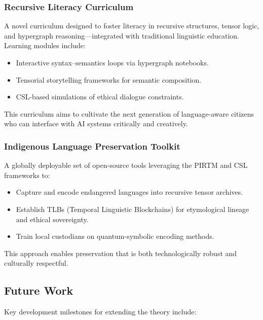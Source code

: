 \documentclass{article}
\theoremstyle{plain}
\theoremstyle{claimstyle}
\begin{document}
\subsubsection*{Recursive Literacy Curriculum}

A novel curriculum designed to foster literacy in recursive structures, tensor logic, and hypergraph reasoning—integrated with traditional linguistic education. Learning modules include:

\begin{itemize}
    \item Interactive syntax–semantics loops via hypergraph notebooks.
    \item Tensorial storytelling frameworks for semantic composition.
    \item CSL-based simulations of ethical dialogue constraints.
\end{itemize}

This curriculum aims to cultivate the next generation of language-aware citizens who can interface with AI systems critically and creatively.

\subsubsection*{Indigenous Language Preservation Toolkit}

A globally deployable set of open-source tools leveraging the PIRTM and CSL frameworks to:

\begin{itemize}
    \item Capture and encode endangered languages into recursive tensor archives.
    \item Establish TLBs (Temporal Linguistic Blockchains) for etymological lineage and ethical sovereignty.
    \item Train local custodians on quantum-symbolic encoding methods.
\end{itemize}

This approach enables preservation that is both technologically robust and culturally respectful.

\subsection{Future Work}

Key development milestones for extending the theory include:
\end{document}
